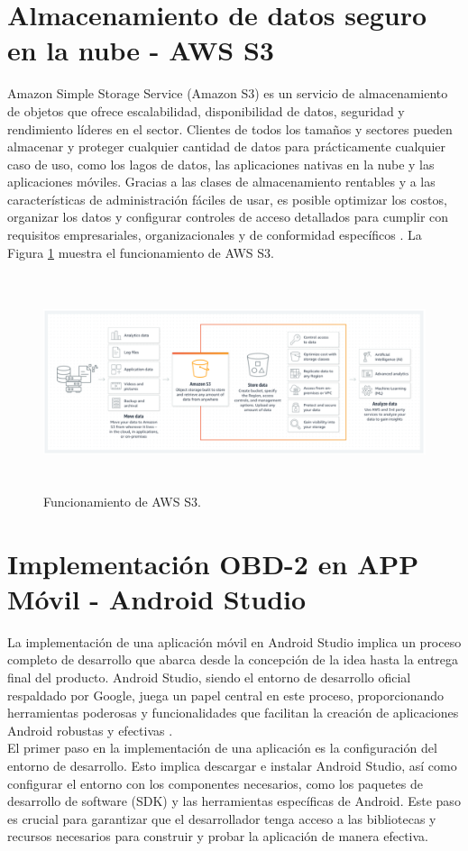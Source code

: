\documentclass[a4paper,10pt, oneside, titlepage]{article}
\begin{document}
	\section{Almacenamiento de datos seguro en la nube - AWS S3}\label{Etiqueta_AWS_S3}
	Amazon Simple Storage Service (Amazon S3) es un servicio de almacenamiento de objetos que ofrece escalabilidad, disponibilidad de datos, seguridad y rendimiento líderes en el sector. Clientes de todos los tamaños y sectores pueden almacenar y proteger cualquier cantidad de datos para prácticamente cualquier caso de uso, como los lagos de datos, las aplicaciones nativas en la nube y las aplicaciones móviles. Gracias a las clases de almacenamiento rentables y a las características de administración fáciles de usar, es posible optimizar los costos, organizar los datos y configurar controles de acceso detallados para cumplir con requisitos empresariales, organizacionales y de conformidad específicos \cite{AWS_S3}. La Figura \ref{Funcionamiento_AWS_S3} muestra el funcionamiento de AWS S3.
	\begin{figure}[!h]
		\centering
		\includegraphics[width = 1\linewidth, height = 6.3cm]{Funcionamiento_AWS_S3.png}
		\caption{Funcionamiento de AWS S3.}
		\label{Funcionamiento_AWS_S3}
	\end{figure}
	
	\section{Implementación OBD-2 en APP Móvil - Android Studio}\label{Android_Studio_OBD}
	La implementación de una aplicación móvil en Android Studio implica un proceso completo de desarrollo que abarca desde la concepción de la idea hasta la entrega final del producto. Android Studio, siendo el entorno de desarrollo oficial respaldado por Google, juega un papel central en este proceso, proporcionando herramientas poderosas y funcionalidades que facilitan la creación de aplicaciones Android robustas y efectivas \cite{Android}. \\\newline
	\indent El primer paso en la implementación de una aplicación es la configuración del entorno de desarrollo. Esto implica descargar e instalar Android Studio, así como configurar el entorno con los componentes necesarios, como los paquetes de desarrollo de software (SDK) y las herramientas específicas de Android. Este paso es crucial para garantizar que el desarrollador tenga acceso a las bibliotecas y recursos necesarios para construir y probar la aplicación de manera efectiva.
\end{document}

